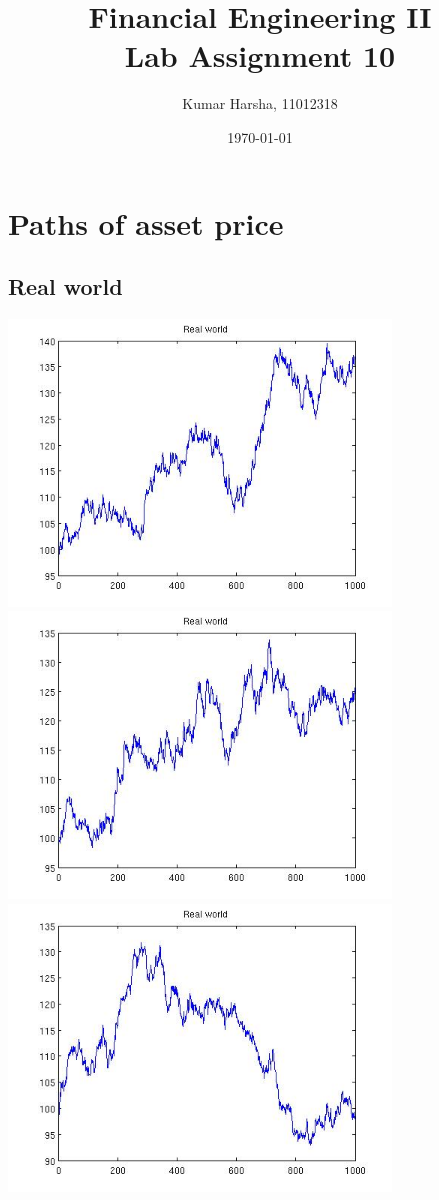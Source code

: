\documentclass[12pt]{article}
\begin{document}
\title{Financial Engineering II\\Lab Assignment 10}
\author{Kumar Harsha, 11012318}
\date{\today}
\maketitle
\tableofcontents
\newpage

\section{Paths of asset price}
  \subsection{Real world}
  \begin{center}
    \includegraphics[width=4in]{real1.jpg}
    \includegraphics[width=4in]{real2.jpg}
    \includegraphics[width=4in]{real3.jpg}

\end{center}
\end{document}
